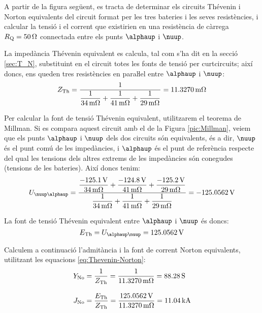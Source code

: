 \begin{exemple}\label{ex:mill_bat}
    A partir de la figura següent, es tracta de determinar els circuits
    Thévenin i Norton equivalents del circuit format per les tres
    bateries i les seves resistències, i calcular la tensió i el
    corrent que existirien en una resistència de càrrega
    $R_\mathrm{Q}=\SI{50}{\ohm}$ connectada entre els punts $\alphaup$
    i $\nuup$.

    \begin{center}
        
    \end{center}

    La impedància Thévenin equivalent es calcula, tal com s'ha dit en la secció \ref{sec:T_N},
    substituint en el circuit totes les fonts de tensió per curtcircuits; així doncs, ens
    queden tres resistències en paraŀlel entre $\alphaup$ i $\nuup$:
    \[
    Z_\mathrm{Th} = \frac{1}{\dfrac{1}{\SI{34}{m\ohm}} +
    \dfrac{1}{\SI{41}{m\ohm}} + \dfrac{1}{\SI{29}{m\ohm}}} =
    \SI{11,3270}{m\ohm}
    \]

    Per calcular la font de tensió Thévenin equivalent, utilitzarem el
    teorema de Millman. Si es compara aquest circuit amb el de la Figura
    \vref{pic:Millman}, veiem que els punts $\alphaup$ i $\nuup$ dels dos
    circuits són equivalents, és a dir, $\nuup$ és el punt comú de les
    impedàncies, i $\alphaup$ és el punt de referència respecte del qual les tensions  dels altres extrems de les impedàncies
    són conegudes
    (tensions de les bateries). Així doncs tenim:
    \[
    U_{\nuup\alphaup} = \frac{\dfrac{\SI{-125,1}{V}}{\SI{34}{m\ohm}} +
    \dfrac{\SI{-124,8}{V}}{\SI{41}{m\ohm}} +
    \dfrac{\SI{-125,2}{V}}{\SI{29}{m\ohm}}}{\dfrac{1}{\SI{34}{m\ohm}}
    + \dfrac{1}{\SI{41}{m\ohm}} + \dfrac{1}{\SI{29}{m\ohm}}} =
    \SI{-125,0562}{V}
    \]

    La font de tensió  Thévenin equivalent entre $\alphaup$ i $\nuup$ és doncs:
    \[
    E\ped{Th} = U_{\alphaup\nuup} = \SI{125,0562}{V}
    \]

    Calculem a continuació l'admitància i la font de corrent  Norton equivalents, utilitzant
    les equacions \eqref{eq:Thevenin-Norton}:
    \begin{align*}
        Y_\mathrm{No} &= \frac{1}{Z_\mathrm{Th}} = \frac{1}{\SI{11,3270}{m\ohm}} = \SI{88,28}{S}
        \\[2ex]
        J_\mathrm{No} &= \frac{E_\mathrm{Th}}{Z_\mathrm{Th}} =
        \frac{\SI{125,0562}{V}}{\SI{11,3270}{m\ohm}}= \SI{11,04}{kA}
    \end{align*}


\end{exemple}
